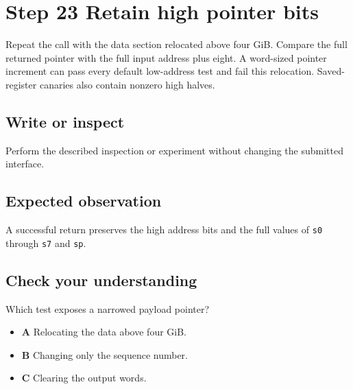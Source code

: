 \section{Step 23 Retain high pointer bits}\label{packet-s23}

Repeat the call with the data section relocated above four GiB. Compare the full returned pointer with the full input address plus eight. A word-sized pointer increment can pass every default low-address test and fail this relocation. Saved-register canaries also contain nonzero high halves.

\subsection{Write or inspect}
Perform the described inspection or experiment without changing the submitted interface.

\subsection{Expected observation}
A successful return preserves the high address bits and the full values of \texttt{s0} through \texttt{s7} and \texttt{sp}.

\subsection{Check your understanding}
Which test exposes a narrowed payload pointer?

\begin{itemize}
  \item \textbf{A} Relocating the data above four GiB.
  \item \textbf{B} Changing only the sequence number.
  \item \textbf{C} Clearing the output words.
\end{itemize}
